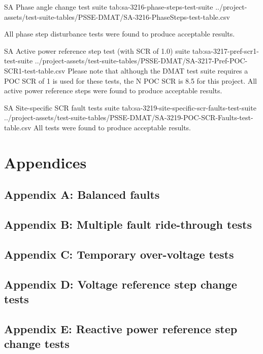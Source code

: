 \documentclass{../grid-link-report}
\newcommand{\projectassetsdir}{../project-assets}
\begin{document}
	{
		\fontsize{7}{9}\selectfont
		\autoscaledlongtable
		{SA Phase angle change test suite}
		{tab:sa-3216-phase-steps-test-suite}
		{\projectassetsdir/test-suite-tables/PSSE-DMAT/SA-3216-PhaseSteps-test-table.csv}
	}
	
	All phase step disturbance tests were found to produce acceptable results.
	
	{
		\fontsize{7}{9}\selectfont
		\autoscaledlongtable
		{SA Active power reference step test (with SCR of 1.0) suite}
		{tab:sa-3217-pref-scr1-test-suite}
		{\projectassetsdir/test-suite-tables/PSSE-DMAT/SA-3217-Pref-POC-SCR1-test-table.csv}
	}
	Please note that although the DMAT test suite requires a POC SCR of 1 is used for these tests, the N POC SCR is 8.5 for this project. All active power reference steps were found to produce acceptable results.
	
	{
		\fontsize{5}{7}\selectfont
		\autoscaledlongtable
		{SA Site-specific SCR fault tests suite}
		{tab:sa-3219-site-specific-scr-faults-test-suite}
		{\projectassetsdir/test-suite-tables/PSSE-DMAT/SA-3219-POC-SCR-Faults-test-table.csv}
	}
	All tests were found to produce acceptable results.
	
	
	
	
	
	\chapter{Appendices}
	\section{Appendix A: Balanced faults}
	\label{Appendix A: Balanced faults}
	\section{Appendix B: Multiple fault ride-through tests}
	\label{Appendix B: Multiple fault ride-through tests}
	\section{Appendix C: Temporary over-voltage tests}
	\label{Appendix C: Temporary over-voltage tests}
	\section{Appendix D: Voltage reference step change tests}
	\label{Appendix D: Voltage reference step change tests}
	\section{Appendix E: Reactive power reference step change tests}
	\label{Appendix E: Reactive power reference step change tests}
\end{document}
